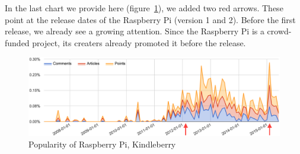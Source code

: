 In the last chart we provide here (figure~\ref{fig:trend_raspberry}), we added two red arrows. These point at the release dates of the Raspberry Pi (version 1 and 2). Before the first release, we already see a growing attention. Since the Raspberry Pi is a crowd-funded project, its creaters already promoted it before the release.
\begin{figure}[H] %
	\caption{Popularity of Raspberry Pi, Kindleberry}
	\label{fig:trend_raspberry}
	\centering
	\includegraphics[width=14cm]{topic_trends/raspberry_relative}
\end{figure}
